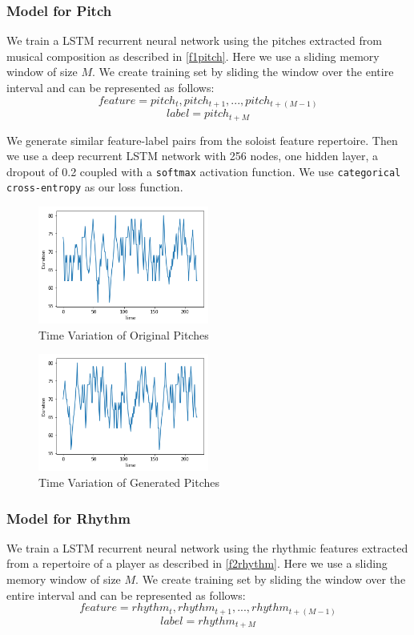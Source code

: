 \documentclass[conference]{IEEEtran}
\begin{document}
\subsubsection{Model for Pitch}
We train a LSTM recurrent neural network using the pitches extracted from musical composition as described in \ref{f1pitch}. Here we use a sliding memory window of size $M$. We create training set by sliding the window over the entire interval and can be represented as follows:
$$feature = {pitch_{t},pitch_{t+1},...,pitch_{t+(M-1)}}$$
$$label = {pitch_{t+M}}$$

We generate similar feature-label pairs from the soloist feature repertoire. Then we use a deep recurrent LSTM network with 256 nodes, one hidden layer, a dropout of 0.2 coupled with a \texttt{softmax} activation function. We use \texttt{categorical cross-entropy} as our loss function.\\

\begin{figure}[h]
\includegraphics[width=0.5\textwidth]{IEEEtran/notes_o.png}
\caption{Time Variation of Original Pitches}
\label{fig:figure1}
\end{figure}

\begin{figure}[h]
\includegraphics[width=0.5\textwidth]{IEEEtran/notes_g.png}
\caption{Time Variation of Generated Pitches}
\label{fig:figure2}
\end{figure}

\subsubsection{Model for Rhythm}
We train a LSTM recurrent neural network using the rhythmic features extracted from a repertoire of a player as described in \ref{f2rhythm}. Here we use a sliding memory window of size $M$. We create training set by sliding the window over the entire interval and can be represented as follows:
$$feature = {rhythm_{t},rhythm_{t+1},...,rhythm_{t+(M-1)}}$$
$$label = {rhythm_{t+M}}$$
\end{document}
